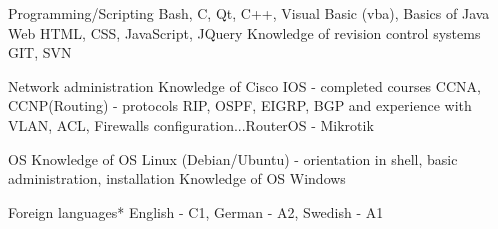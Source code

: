 \begin{cvskills}

  \vspace{5pt}
  
  \cvskill
    {Programming/Scripting} %
    {Bash, C, Qt, C++, Visual Basic (vba), Basics of Java} %
  \vspace{5pt}
  \cvskill
    {Web} %
    {HTML, CSS, JavaScript, JQuery \newline Knowledge of revision control systems GIT, SVN}
  

  \vspace{5pt}
    
  \cvskill
    {Network administration} %
    {Knowledge of Cisco IOS - completed courses CCNA, CCNP(Routing) - protocols RIP, OSPF, EIGRP, BGP and \newline experience with VLAN, ACL, Firewalls configuration...\newline RouterOS - Mikrotik} %
  
  \vspace{5pt}
  \cvskill
    {OS}
    {Knowledge of OS Linux (Debian/Ubuntu) - orientation in shell, basic administration, installation \newline Knowledge of OS Windows}
  \vspace{5pt}
    
  \cvskill
    {Foreign languages*} %
    {English - C1, German - A2, Swedish - A1} %

\end{cvskills}